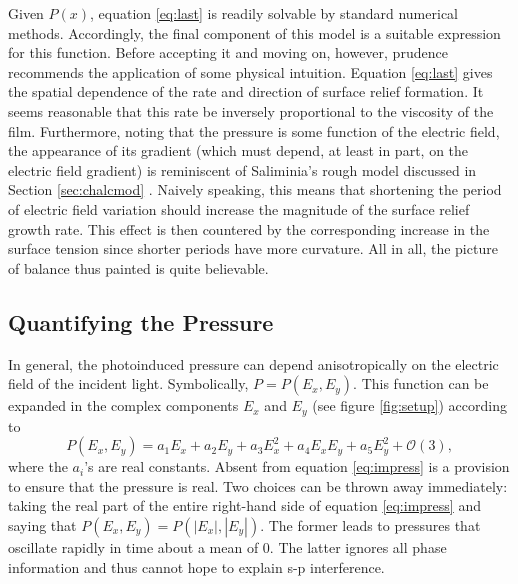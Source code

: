 \documentclass[twocolumn,showpacs,preprintnumbers,amsmath,amssymb]{revtex4}
\begin{document}
Given $P(x)$, equation \ref{eq:last} is readily solvable by standard
numerical methods.  Accordingly, the final component of this model is
a suitable expression for this function. %
Before accepting it and moving on, however, prudence
recommends the application of some physical intuition. Equation
\ref{eq:last} gives the spatial dependence of the rate and direction
of surface relief formation. It seems reasonable that this rate be
inversely proportional to the viscosity of the film. Furthermore,
noting that the pressure is some function of the electric field, the
appearance of its gradient (which must depend, at least in part, on
the electric field gradient) is reminiscent of Saliminia's rough model
discussed in Section \ref{sec:chalcmod} \cite{saliminia}. Naively
speaking, this means that shortening the period of electric field
variation should increase the magnitude of the surface relief growth
rate. This effect is then countered by the corresponding increase in
the surface tension since shorter periods have more curvature. All in
all, the picture of balance thus painted is quite believable.

\subsection{Quantifying the Pressure}
\label{sec:presquant}

In general, the photoinduced pressure can depend anisotropically on
the electric field of the incident light. Symbolically,
$P=P(E_x,E_y)$. This function can be expanded in the complex
components $E_x$ and $E_y$ (see figure \ref{fig:setup}) according to
\begin{equation}
P(E_x,E_y)=a_1E_x+a_2E_y+a_3E_x^2+a_4E_xE_y+a_5E_y^2+\mathcal{O}(3) \mathrm{,}
\label{eq:impress}
\end{equation}
where the $a_i$'s are real constants. Absent from equation
\ref{eq:impress} is a provision to ensure that the pressure is real.
Two choices can be thrown away immediately: taking the real part of
the entire right-hand side of equation \ref{eq:impress} and saying
that $P(E_x,E_y)=P(|E_x|,|E_y|)$. The former leads to pressures that
oscillate rapidly in time about a mean of 0. The latter ignores all
phase information and thus cannot hope to explain s-p interference.
\end{document}
